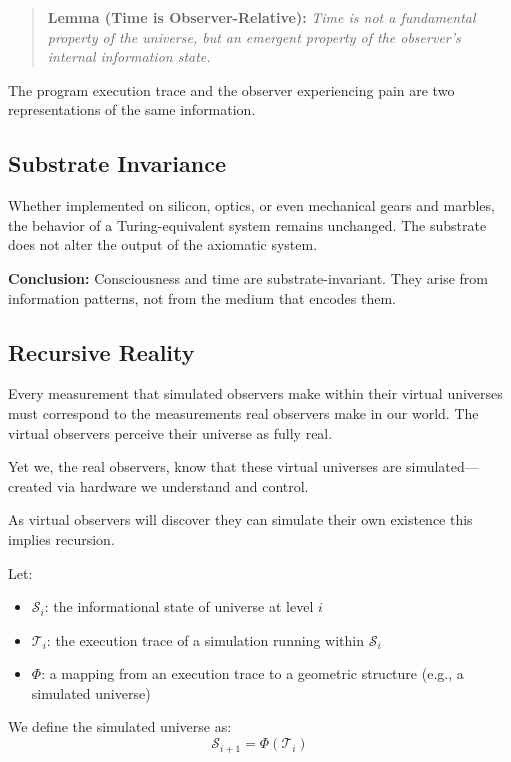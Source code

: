 \documentclass[11pt]{article}
\begin{document}
\begin{quote}
  \textbf{Lemma (Time is Observer-Relative):} \emph{Time is not a fundamental property of the universe, but an emergent property of the observer’s internal information state.}
\end{quote}

The program execution trace and the observer experiencing pain are two representations of the same information.

\subsection{Substrate Invariance}

Whether implemented on silicon, optics, or even mechanical gears and marbles, the behavior of a Turing-equivalent system remains unchanged. The substrate does not alter the output of the axiomatic system.

\textbf{Conclusion:} Consciousness and time are substrate-invariant. They arise from information patterns, not from the medium that encodes them.

\subsection{Recursive Reality}

Every measurement that simulated observers make within their virtual universes must correspond to the measurements real observers make in our world. The virtual observers perceive their universe as fully real.

Yet we, the real observers, know that these virtual universes are simulated—created via hardware we understand and control.

As virtual observers will discover they can simulate their own existence \cite{bostrom2003} this implies recursion.

Let:

\begin{itemize}
  \item \( \mathcal{S}_i \): the informational state of universe at level \( i \)
  \item \( \mathcal{T}_i \): the execution trace of a simulation running within \( \mathcal{S}_i \)
  \item \( \Phi \): a mapping from an execution trace to a geometric structure (e.g., a simulated universe)
\end{itemize}

We define the simulated universe as:
\[
  \mathcal{S}_{i+1} = \Phi(\mathcal{T}_i)
\]
\end{document}
